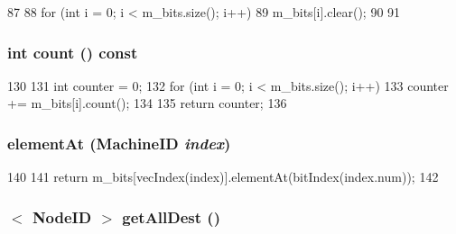 \begin{DoxyCode}
87 {
88     for (int i = 0; i < m_bits.size(); i++) {
89         m_bits[i].clear();
90     }
91 }
\end{DoxyCode}
\hypertarget{classNetDest_a0745638c9967e2ed90bc96c012288c55}{
\subsubsection[{count}]{\setlength{\rightskip}{0pt plus 5cm}int count () const}}
\label{classNetDest_a0745638c9967e2ed90bc96c012288c55}



\begin{DoxyCode}
130 {
131     int counter = 0;
132     for (int i = 0; i < m_bits.size(); i++) {
133         counter += m_bits[i].count();
134     }
135     return counter;
136 }
\end{DoxyCode}
\hypertarget{classNetDest_a07fad8a8a4b3e4ebf730a781d1e9ed33}{
\subsubsection[{elementAt}]{ elementAt ({\bf MachineID} {\em index})}}
\label{classNetDest_a07fad8a8a4b3e4ebf730a781d1e9ed33}



\begin{DoxyCode}
140 {
141     return m_bits[vecIndex(index)].elementAt(bitIndex(index.num));
142 }
\end{DoxyCode}
\hypertarget{classNetDest_a44d9161ca3a378dcfa4f127cba7e7a37}{
\subsubsection[{getAllDest}]{$<$ {\bf NodeID} $>$ getAllDest ()}}
\label{classNetDest_a44d9161ca3a378dcfa4f127cba7e7a37}



